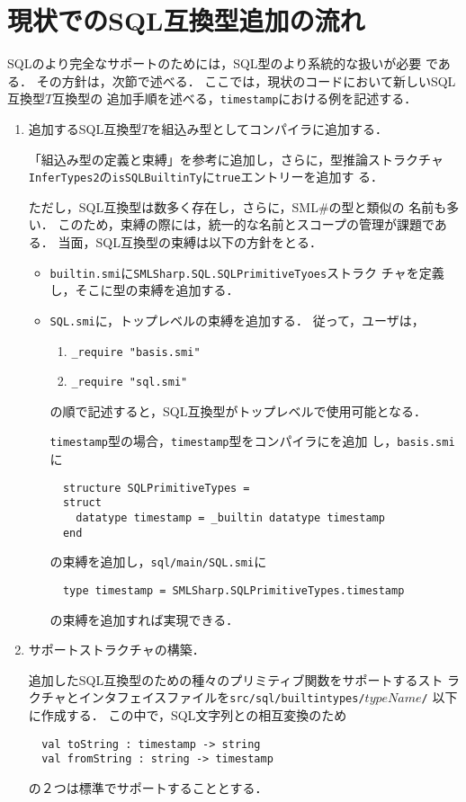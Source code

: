 \documentclass{jbook}
\newcommand{\smlsharp}{SML\#}
\newcommand{\code}[1]{\mbox{\large\tt #1}}
\begin{document}
\section{現状でのSQL互換型追加の流れ}
	SQLのより完全なサポートのためには，SQL型のより系統的な扱いが必要
である．
	その方針は，次節で述べる．
	ここでは，現状のコードにおいて新しいSQL互換型$T$互換型の
追加手順を述べる，\code{timestamp}における例を記述する．
\begin{enumerate}

\item 追加するSQL互換型$T$を組込み型としてコンパイラに追加する．

	「組込み型の定義と束縛」を参考に追加し，さらに，型推論ストラクチャ
\code{InferTypes2}の\code{isSQLBuiltinTy}に\code{true}エントリーを追加す
る．

	ただし，SQL互換型は数多く存在し，さらに，\smlsharp{}の型と類似の
名前も多い．
	このため，束縛の際には，統一的な名前とスコープの管理が課題である．
	当面，SQL互換型の束縛は以下の方針をとる．
\begin{itemize}
\item \code{builtin.smi}に\code{SMLSharp.SQL.SQLPrimitiveTyoes}ストラク
チャを定義し，そこに型の束縛を追加する．
\item \code{SQL.smi}に，トップレベルの束縛を追加する．
	従って，ユーザは，
\begin{enumerate}
\item \code{\_require "basis.smi"}
\item \code{\_require "sql.smi"}
\end{enumerate}
の順で記述すると，SQL互換型がトップレベルで使用可能となる．

	\code{timestamp}型の場合，\code{timestamp}型をコンパイラにを追加
し，\code{basis.smi}に
\begin{verbatim}
  structure SQLPrimitiveTypes =
  struct
    datatype timestamp = _builtin datatype timestamp
  end
\end{verbatim}
の束縛を追加し，\code{sql/main/SQL.smi}に
\begin{verbatim}
  type timestamp = SMLSharp.SQLPrimitiveTypes.timestamp
\end{verbatim}
の束縛を追加すれば実現できる．

\end{itemize}
\item サポートストラクチャの構築．

	追加したSQL互換型のための種々のプリミティブ関数をサポートするスト
ラクチャとインタフェイスファイルを\code{src/sql/builtintypes/$typeName$/}
以下に作成する．
	この中で，SQL文字列との相互変換のため
\begin{verbatim}
  val toString : timestamp -> string
  val fromString : string -> timestamp
\end{verbatim}
の２つは標準でサポートすることとする．


\end{enumerate}
\end{document}
